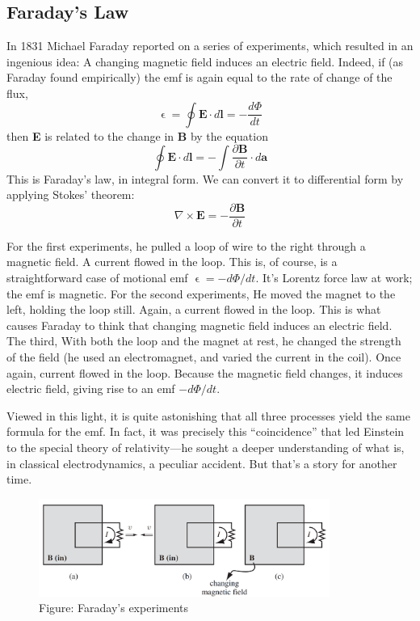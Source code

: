 \documentclass[../../../main.tex]{subfiles}
\begin{document}
\subsection*{Faraday's Law}
In 1831 Michael Faraday reported on a series of experiments, which resulted in an ingenious idea: A changing magnetic ﬁeld induces an electric ﬁeld. Indeed, if (as Faraday found empirically) the emf is again equal to the rate of change of the ﬂux,
\begin{equation*}
    \upvarepsilon=\oint \mathbf{E}\cdot d\mathbf{l}=-\frac{d\Phi}{dt}
\end{equation*}
then \textbf{E} is related to the change in \textbf{B} by the equation
\begin{equation*}
    \oint \mathbf{E}\cdot d\mathbf{l}=-\int \frac{\partial \mathbf{B}}{\partial t}\cdot d\mathbf{a}
\end{equation*}
This is Faraday's law, in integral form. We can convert it to differential form by 
applying Stokes' theorem:
\begin{equation*}
    \nabla\times \mathbf{E}=-\frac{\partial \mathbf{B}}{\partial t}
\end{equation*}

For the first experiments, he pulled a loop of wire to the right through a magnetic ﬁeld. A current ﬂowed in the loop. This is, of course, is a straightforward case of motional emf $\upvarepsilon=-d\Phi/dt$. It’s  Lorentz force law at work; the emf is magnetic. For the second experiments, He moved the magnet to the left, holding the loop still. Again, a current ﬂowed in the loop. This is what causes Faraday to think that changing magnetic ﬁeld induces an electric ﬁeld. The third, With both the loop and the magnet at rest, he changed the strength of the ﬁeld (he used an electromagnet, and varied the current 
in the coil). Once again, current ﬂowed in the loop. Because the magnetic field changes, it induces electric field, giving rise to an emf $-d\Phi/dt$. 

Viewed in this light, it is quite astonishing that all three processes yield the same formula for the emf. In fact, it was precisely this “coincidence” that led Einstein to the special theory of relativity—he sought a deeper understanding of what is, in classical electrodynamics, a peculiar accident. But that’s a story for another time.
\begin{figure}[b]
    \centering
    \includegraphics[width=0.85\textwidth]{../Rss/Electromagnetism/Electrodynamics/Faraday.png}
    \caption*{Figure: Faraday's experiments}
\end{figure}
\end{document}
